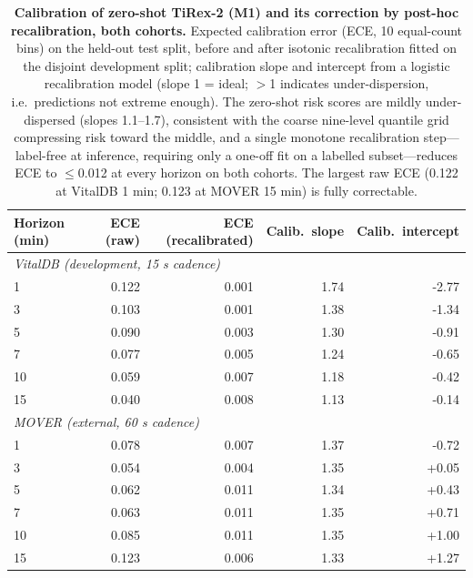 \begin{table}[ht]
\centering\footnotesize
\caption{\textbf{Calibration of zero-shot TiRex-2 (M1) and its correction by post-hoc recalibration, both cohorts.} Expected calibration error (ECE, 10 equal-count bins) on the held-out test split, before and after isotonic recalibration fitted on the disjoint development split; calibration slope and intercept from a logistic recalibration model (slope 1 = ideal; $>$1 indicates under-dispersion, i.e.\ predictions not extreme enough). The zero-shot risk scores are mildly under-dispersed (slopes 1.1--1.7), consistent with the coarse nine-level quantile grid compressing risk toward the middle, and a single monotone recalibration step---label-free at inference, requiring only a one-off fit on a labelled subset---reduces ECE to $\leq$0.012 at every horizon on both cohorts. The largest raw ECE (0.122 at VitalDB 1 min; 0.123 at MOVER 15 min) is fully correctable.}
\label{tab:calibration}
\begin{tabular}{lrrrr}
\toprule
Horizon (min) & ECE (raw) & ECE (recalibrated) & Calib.\ slope & Calib.\ intercept \\
\midrule
\multicolumn{5}{l}{\textit{VitalDB (development, 15 s cadence)}}\\
1 & 0.122 & 0.001 & 1.74 & -2.77 \\
3 & 0.103 & 0.001 & 1.38 & -1.34 \\
5 & 0.090 & 0.003 & 1.30 & -0.91 \\
7 & 0.077 & 0.005 & 1.24 & -0.65 \\
10 & 0.059 & 0.007 & 1.18 & -0.42 \\
15 & 0.040 & 0.008 & 1.13 & -0.14 \\
\midrule
\multicolumn{5}{l}{\textit{MOVER (external, 60 s cadence)}}\\
1 & 0.078 & 0.007 & 1.37 & -0.72 \\
3 & 0.054 & 0.004 & 1.35 & +0.05 \\
5 & 0.062 & 0.011 & 1.34 & +0.43 \\
7 & 0.063 & 0.011 & 1.35 & +0.71 \\
10 & 0.085 & 0.011 & 1.35 & +1.00 \\
15 & 0.123 & 0.006 & 1.33 & +1.27 \\
\bottomrule
\end{tabular}
\end{table}

